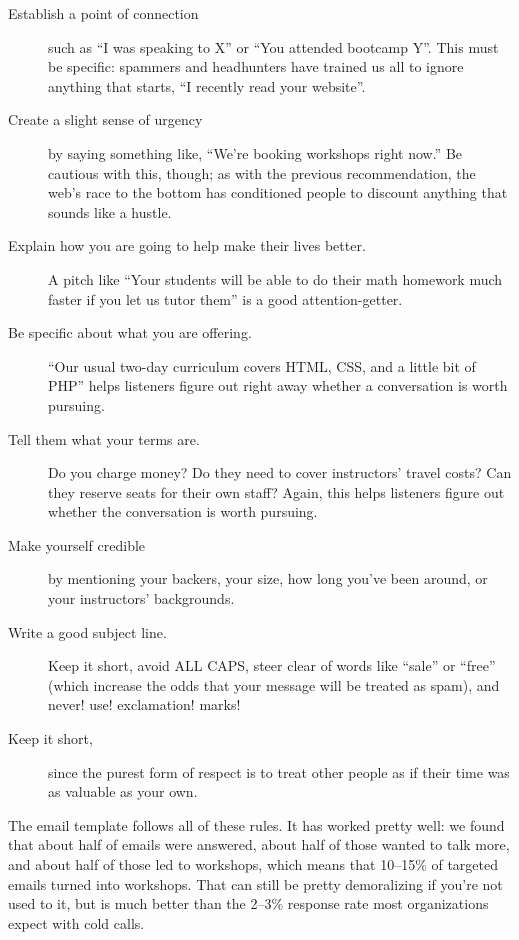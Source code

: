 \begin{description}

\item[Establish a point of connection]
  such as ``I was speaking to X'' or ``You attended bootcamp Y''.
  This must be specific:
  spammers and headhunters have trained us all to ignore anything that starts,
  ``I recently read your website''.

\item[Create a slight sense of urgency]
  by saying something like,
  ``We're booking workshops right now.''
  Be cautious with this,
  though;
  as with the previous recommendation,
  the web's race to the bottom has conditioned people to discount
  anything that sounds like a hustle.

\item[Explain how you are going to help make their lives better.]
  A pitch like ``Your students will be able to do their math homework much faster if you let us tutor them''
  is a good attention-getter.

\item[Be specific about what you are offering.]
  ``Our usual two-day curriculum covers HTML, CSS, and a little bit of PHP''
  helps listeners figure out right away whether a conversation is worth pursuing.

\item[Tell them what your terms are.]
  Do you charge money?
  Do they need to cover instructors' travel costs?
  Can they reserve seats for their own staff?
  Again,
  this helps listeners figure out whether the conversation is worth pursuing.

\item[Make yourself credible]
  by mentioning your backers,
  your size,
  how long you've been around,
  or your instructors' backgrounds.

\item[Write a good subject line.]
  Keep it short,
  avoid ALL CAPS,
  steer clear of words like ``sale'' or ``free''
  (which increase the odds that your message will be treated as spam),
  and never! use! exclamation! marks!

\item[Keep it short,]
  since the purest form of respect is
  to treat other people as if their time was as valuable as your own.

\end{description}

The email template follows all of these rules.
It has worked pretty well:
we found that about half of emails were answered,
about half of those wanted to talk more,
and about half of those led to workshops,
which means that 10--15\% of targeted emails turned into workshops.
That can still be pretty demoralizing if you're not used to it,
but is much better than the 2--3\% response rate most organizations expect with cold calls.

